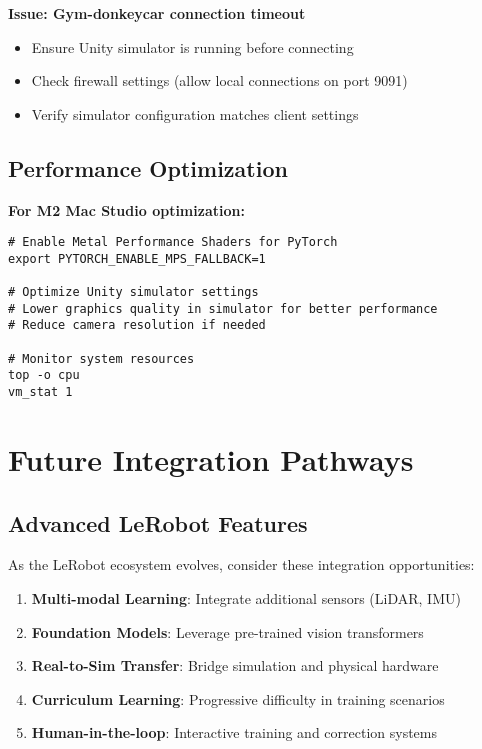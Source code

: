 \documentclass[11pt,a4paper]{article}
\begin{document}
\textbf{Issue: Gym-donkeycar connection timeout}
\begin{itemize}
    \item Ensure Unity simulator is running before connecting
    \item Check firewall settings (allow local connections on port 9091)
    \item Verify simulator configuration matches client settings
\end{itemize}

\subsection{Performance Optimization}

\textbf{For M2 Mac Studio optimization:}

\begin{lstlisting}[style=bashstyle, caption={Performance optimization commands}]
# Enable Metal Performance Shaders for PyTorch
export PYTORCH_ENABLE_MPS_FALLBACK=1

# Optimize Unity simulator settings
# Lower graphics quality in simulator for better performance
# Reduce camera resolution if needed

# Monitor system resources
top -o cpu
vm_stat 1
\end{lstlisting}

\section{Future Integration Pathways}

\subsection{Advanced LeRobot Features}

As the LeRobot ecosystem evolves, consider these integration opportunities:

\begin{enumerate}
    \item \textbf{Multi-modal Learning}: Integrate additional sensors (LiDAR, IMU)
    \item \textbf{Foundation Models}: Leverage pre-trained vision transformers
    \item \textbf{Real-to-Sim Transfer}: Bridge simulation and physical hardware
    \item \textbf{Curriculum Learning}: Progressive difficulty in training scenarios
    \item \textbf{Human-in-the-loop}: Interactive training and correction systems
\end{enumerate}
\end{document}
